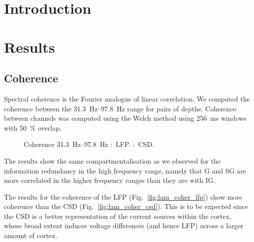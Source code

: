 \section{Introduction}

\section{Results}

\subsection{Coherence}

Spectral coherence is the Fourier analogue of linear correlation.
We computed the coherence between the \SIrange{31.3}{97.8}{Hz} range for pairs of depths.
Coherence between channels was computed using the Welch method using \SI{256}{\milli\second} windows with \SI{50}{\percent} overlap.

\begin{figure}[htb]
    \centering
    \hspace*{\fill}
    \hspace*{\fill}\hspace{.2cm}\hspace*{\fill}
    \hspace*{\fill}
    \caption{Coherence \SIrange{31.3}{97.8}{Hz}
\protect{}:~\ac{LFP}.
\protect{}:~\ac{CSD}.
}
\label{fig:lam_coher}
\end{figure}

The results show the same compartmentalisation as we observed for the information redundancy in the high frequency range, namely that \ac{G} and \ac{SG} are more correlated in the higher frequency ranges than they are with \ac{IG}.

The results for the coherence of the \ac{LFP} (Fig.~\ref{fig:lam_coher_lfp}) show more coherence than the \ac{CSD} (Fig.~\ref{fig:lam_coher_csd}).
This is to be expected since the \ac{CSD} is a better representation of the current sources within the cortex, whose broad extent induces voltage differences (and hence \ac{LFP}) across a larger amount of cortex.

